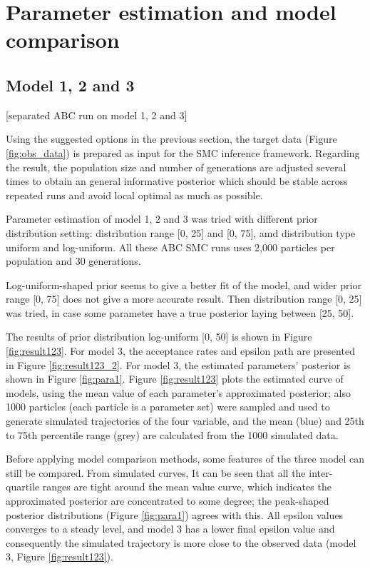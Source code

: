 \section{Parameter estimation and model comparison}

\subsection{Model 1, 2 and 3}

[separated ABC run on model 1, 2 and 3]

Using the suggested options in the previous section, the target data (Figure \ref{fig:obs_data}) is prepared as input for the SMC inference framework. Regarding the result, the population size and number of generations are adjusted several times to obtain an general informative posterior which should be stable across repeated runs and avoid local optimal as much as possible.

Parameter estimation of model 1, 2 and 3 was tried with different prior distribution setting: distribution range [0, 25] and [0, 75], amd distribution type uniform and log-uniform. All these ABC SMC runs uses 2,000 particles per population and 30 generations.

Log-uniform-shaped prior seems to give a better fit of the model, and wider prior range [0, 75] does not give a more accurate result. Then distribution range [0, 25] was tried, in case some parameter have a true posterior laying between [25, 50].

The results of prior distribution log-uniform [0, 50] is shown in Figure \ref{fig:result123}. For model 3, the acceptance rates and epsilon path are presented in Figure \ref{fig:result123_2}. For model 3, the estimated parameters' posterior is shown in Figure \ref{fig:para1}. Figure \ref{fig:result123} plots the estimated curve of models, using the mean value of each parameter's approximated posterior; also 1000 particles (each particle is a parameter set) were sampled and used to generate simulated trajectories of the four variable, and the mean (blue) and 25th to 75th percentile range (grey) are calculated from the 1000 simulated data.

Before applying model comparison methods, some features of the three model can still be compared. From simulated curves, It can be seen that all the inter-quartile ranges are tight around the mean value curve, which indicates the approximated posterior are concentrated to some degree; the peak-shaped posterior distributions (Figure \ref{fig:para1}) agrees with this. All epsilon values converges to a steady level, and model 3 has a lower final epsilon value and consequently the simulated trajectory is more close to the observed data (model 3, Figure \ref{fig:result123}).

